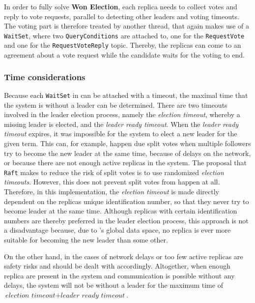 In order to fully solve \textbf{Won Election}, each replica needs to collect votes and reply to vote requests, parallel to detecting other leaders and voting timeouts.
The voting part is therefore treated by another  thread, that again makes use of a \texttt{WaitSet}, where two \texttt{QueryConditions} are attached to, one for the \texttt{RequestVote} and one for the \texttt{RequestVoteReply} topic.
Thereby, the replicas can come to an agreement about a vote request while the candidate waits for the voting to end.


\subsubsection{Time considerations}
\label{subsub:timeConsiderations}
Because each \texttt{WaitSet} in  can be attached with a timeout, the maximal time that the system is without a leader can be determined.
There are two timeouts involved in the leader election process, namely the \textit{election timeout}, whereby a missing leader is elected, and the \textit{leader ready timeout}.
When the \textit{leader ready timeout} expires, it was impossible for the system to elect a new leader for the given term.
This can, for example, happen due split votes when multiple followers try to become the new leader at the same time, because of delays on the network, or because there are not enough active replicas in the system.
The proposal that \texttt{Raft} makes to reduce the risk of split votes is to use randomized \textit{election timeouts}.
However, this does not prevent split votes from happen at all.
Therefore, in this implementation, the \textit{election timeout} is made directly dependent on the replicas unique identification number, so that they never try to become leader at the same time.
Although replicas with certain identification numbers are thereby preferred in the leader election process, this approach is not a disadvantage because, due to 's global data space, no replica is ever more suitable for becoming the new leader than some other.

On the other hand, in the cases of network delays or too few active replicas are safety risks and should be dealt with accordingly.
Altogether, when enough replica are present in the system and communication is possible without any delays, the system will not be without a leader for the maximum time of $\textit{election timeout} + \textit{leader ready timeout}$.

